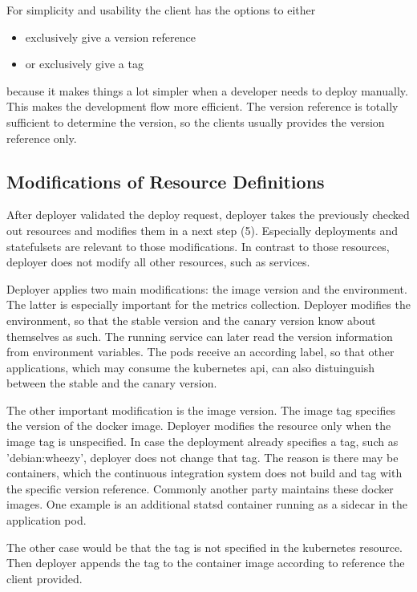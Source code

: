 For simplicity and usability the client has the options to either
\begin{itemize}
    \item exclusively give a version reference
    \item or exclusively give a tag
\end{itemize}
because it makes things a lot simpler when a developer needs to deploy
manually. This makes the development flow more efficient. The version reference is totally
sufficient to determine the version, so the clients usually provides the version reference
only.

\subsection{Modifications of Resource Definitions}

After deployer validated the deploy request, deployer takes the previously checked out
resources and modifies them in a next step (5). Especially deployments and statefulsets
are relevant to those modifications. In contrast to those resources, deployer does not
modify all other resources, such as services.

Deployer applies two main modifications: the image version and the environment. The latter
is especially important for the metrics collection. Deployer modifies the environment, so
that the stable version and the canary version know about themselves as such. The running
service can later read the version information from environment variables. The pods
receive an according label, so that other applications, which may consume the kubernetes
api, can also distuinguish between the stable and the canary version.

The other important modification is the image version. The image tag specifies the version
of the docker image. Deployer modifies the resource only when the image tag is
unspecified. In case the deployment already specifies a tag, such as 'debian:wheezy',
deployer does not change that tag. The reason is there may be containers, which the
continuous integration system does not build and tag with the specific version
reference. Commonly another party maintains these docker images. One example is an
additional statsd container running as a sidecar in the application pod.

The other case would be that the tag is not specified in the kubernetes resource. Then
deployer appends the tag to the container image according to reference the client provided.

